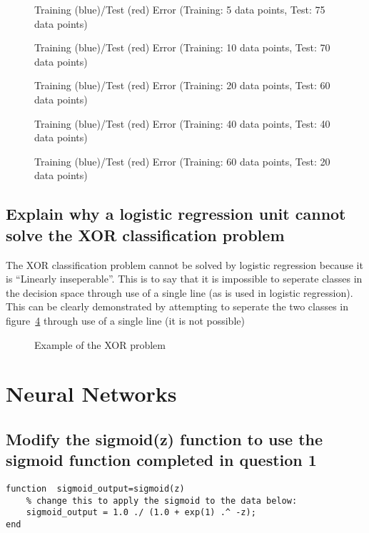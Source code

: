 \documentclass[titlepage]{scrartcl}
\begin{document}
\begin{figure}
    \caption{Training (blue)/Test (red) Error (Training: 5 data points, Test:
    75 data points)}
    \label{costTestTrain5}
    \caption{Training (blue)/Test (red) Error (Training: 10 data points, Test:
    70 data points)}
    \label{costTestTrain10}
\end{figure}
\begin{figure}
    \caption{Training (blue)/Test (red) Error (Training: 20 data points, Test:
    60 data points)}
    \label{costTestTrain20}
    \caption{Training (blue)/Test (red) Error (Training: 40 data points, Test:
    40 data points)}
    \label{costTestTrain40}
\end{figure}
\begin{figure}
    \caption{Training (blue)/Test (red) Error (Training: 60 data points, Test:
    20 data points)}
    \label{costTestTrain60}
\end{figure}

\subsection{Explain why a logistic regression unit cannot solve the XOR
classification problem}
The XOR classification problem cannot be solved by logistic regression because
it is ``Linearly inseperable''. This is to say that it is impossible to
seperate classes in the decision space through use of a single line (as is used
in logistic regression). This can be clearly demonstrated by attempting to
seperate the two classes in figure~\ref{XOR} through use of a single line (it is not
possible)

\begin{figure}
    \caption{Example of the XOR problem}
    \label{XOR}
\end{figure}

\section{Neural Networks}
\subsection{Modify the sigmoid(z) function to use the sigmoid function
completed in question 1}
\begin{lstlisting}
function  sigmoid_output=sigmoid(z)
    % change this to apply the sigmoid to the data below:
    sigmoid_output = 1.0 ./ (1.0 + exp(1) .^ -z);
end
\end{lstlisting}
\end{document}
